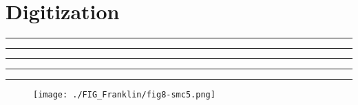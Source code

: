 \setcounter{chapter}{7}
\setcounter{section}{0}
\section{Digitization}
\vspace{-8pt} \hrule \hrule \hrule \hrule \hrule  \vspace{12pt}

	    \begin{figure}[!h]
	        \centering
	        \texttt{[image: ./FIG\_Franklin/fig8-smc5.png]}
	    \end{figure}
